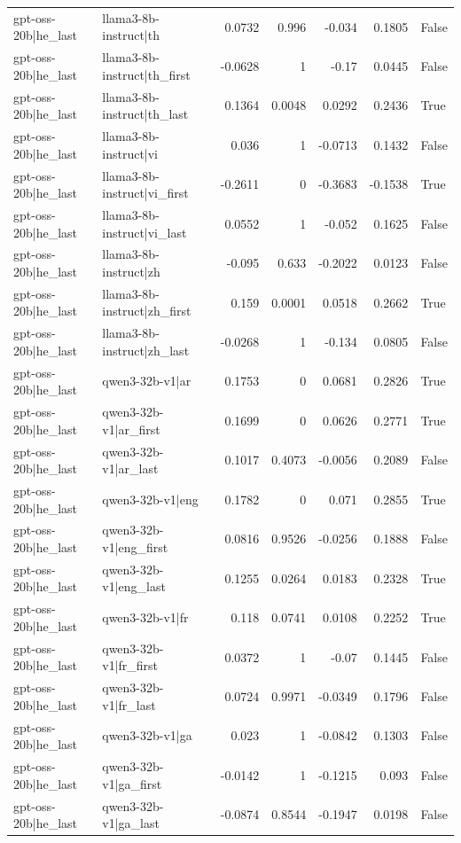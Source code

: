 \begin{table}
\begin{tabular}{l l r r r r l}
gpt-oss-20b|he_last & llama3-8b-instruct|th & 0.0732 & 0.996 & -0.034 & 0.1805 & False \\
gpt-oss-20b|he_last & llama3-8b-instruct|th_first & -0.0628 & 1 & -0.17 & 0.0445 & False \\
gpt-oss-20b|he_last & llama3-8b-instruct|th_last & 0.1364 & 0.0048 & 0.0292 & 0.2436 & True \\
gpt-oss-20b|he_last & llama3-8b-instruct|vi & 0.036 & 1 & -0.0713 & 0.1432 & False \\
gpt-oss-20b|he_last & llama3-8b-instruct|vi_first & -0.2611 & 0 & -0.3683 & -0.1538 & True \\
gpt-oss-20b|he_last & llama3-8b-instruct|vi_last & 0.0552 & 1 & -0.052 & 0.1625 & False \\
gpt-oss-20b|he_last & llama3-8b-instruct|zh & -0.095 & 0.633 & -0.2022 & 0.0123 & False \\
gpt-oss-20b|he_last & llama3-8b-instruct|zh_first & 0.159 & 0.0001 & 0.0518 & 0.2662 & True \\
gpt-oss-20b|he_last & llama3-8b-instruct|zh_last & -0.0268 & 1 & -0.134 & 0.0805 & False \\
gpt-oss-20b|he_last & qwen3-32b-v1|ar & 0.1753 & 0 & 0.0681 & 0.2826 & True \\
gpt-oss-20b|he_last & qwen3-32b-v1|ar_first & 0.1699 & 0 & 0.0626 & 0.2771 & True \\
gpt-oss-20b|he_last & qwen3-32b-v1|ar_last & 0.1017 & 0.4073 & -0.0056 & 0.2089 & False \\
gpt-oss-20b|he_last & qwen3-32b-v1|eng & 0.1782 & 0 & 0.071 & 0.2855 & True \\
gpt-oss-20b|he_last & qwen3-32b-v1|eng_first & 0.0816 & 0.9526 & -0.0256 & 0.1888 & False \\
gpt-oss-20b|he_last & qwen3-32b-v1|eng_last & 0.1255 & 0.0264 & 0.0183 & 0.2328 & True \\
gpt-oss-20b|he_last & qwen3-32b-v1|fr & 0.118 & 0.0741 & 0.0108 & 0.2252 & True \\
gpt-oss-20b|he_last & qwen3-32b-v1|fr_first & 0.0372 & 1 & -0.07 & 0.1445 & False \\
gpt-oss-20b|he_last & qwen3-32b-v1|fr_last & 0.0724 & 0.9971 & -0.0349 & 0.1796 & False \\
gpt-oss-20b|he_last & qwen3-32b-v1|ga & 0.023 & 1 & -0.0842 & 0.1303 & False \\
gpt-oss-20b|he_last & qwen3-32b-v1|ga_first & -0.0142 & 1 & -0.1215 & 0.093 & False \\
gpt-oss-20b|he_last & qwen3-32b-v1|ga_last & -0.0874 & 0.8544 & -0.1947 & 0.0198 & False \\

\end{tabular}
\end{table}
